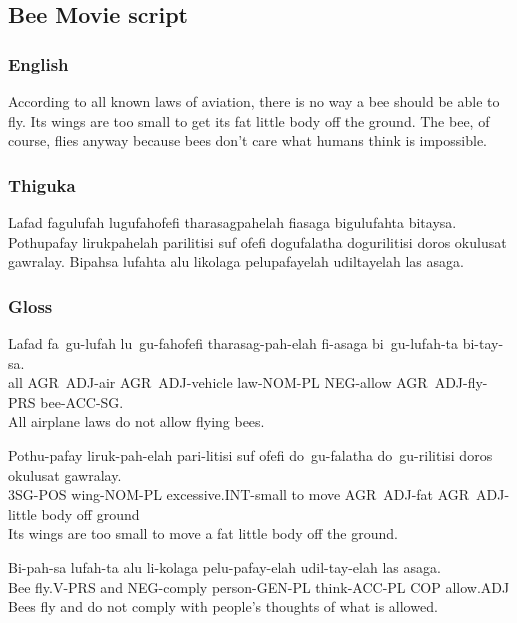 \newpage

\subsection{Bee Movie script}

\subsubsection*{English}
According to all known laws of aviation, there is no way a bee should be able to fly.
Its wings are too small to get its fat little body off the ground.
The bee, of course, flies anyway because bees don't care what humans think is impossible.

\subsubsection*{Thiguka}
Lafad fagulufah lugufahofefi tharasagpahelah fiasaga bigulufahta bitaysa.
Pothupafay lirukpahelah parilitisi suf ofefi dogufalatha dogurilitisi doros okulusat gawralay.
Bipahsa lufahta alu likolaga pelupafayelah udiltayelah las asaga.

\subsubsection*{Gloss}
\begin{exe}
    \ex{} \gll{}Lafad fa~gu-lufah lu~gu-fahofefi tharasag-pah-elah fi-asaga bi~gu-lufah-ta bi-tay-sa.\\
                all AGR~ADJ-air AGR~ADJ-vehicle law-NOM-PL NEG-allow AGR~ADJ-fly-PRS bee-ACC-SG.\\
          \glt{}All airplane laws do not allow flying bees.
\end{exe}

\begin{exe}
    \ex{} \gll{}Pothu-pafay liruk-pah-elah  pari-litisi suf ofefi  do~gu-falatha do~gu-rilitisi doros okulusat gawralay.\\
                3SG-POS wing-NOM-PL  excessive.INT-small to move  AGR~ADJ-fat AGR~ADJ-little body off ground\\
          \glt{}Its wings are too small to move a fat little body off the ground.
\end{exe}

\begin{exe}
    \ex{} \gll{}Bi-pah-sa lufah-ta alu li-kolaga pelu-pafay-elah udil-tay-elah las asaga.\\
                Bee fly.V-PRS and NEG-comply person-GEN-PL think-ACC-PL COP allow.ADJ\\
          \glt{}Bees fly and do not comply with people's thoughts of what is allowed.
\end{exe}


